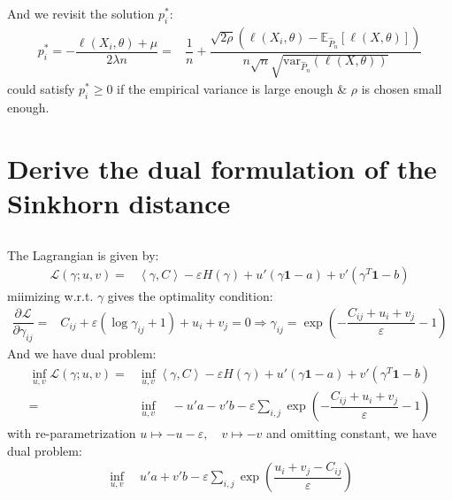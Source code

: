 \documentclass[11pt,a4paper]{ctexart}
\numberwithin{equation}{section}%
\begin{document}
And we revisit the solution $ p_i^* $:
\begin{align*}
    p_i^* = - \dfrac{ \ell(X_i,\theta )+\mu  }{ 2\lambda n } = & \dfrac{ 1 }{ n }+ \dfrac{ \sqrt{2\rho }(\ell(X_i,\theta )- \mathbb{E}_{\hat{P}_n}\left[ \ell(X,\theta ) \right] ) }{ n\sqrt{n} \sqrt{\mathrm{var}_{\hat{P}_n}(\ell(X,\theta ))} }  
\end{align*}
could satisfy $ p_i^*\geq 0 $ if the empirical variance is large enough \& $ \rho  $ is chosen small enough.


\section{Derive the dual formulation of the Sinkhorn distance}

\subsection{}
The Lagrangian is given by:
\begin{align*}
    \mathcal{L}(\gamma ; u,v)=& \left\langle \gamma ,C \right\rangle -\varepsilon  H(\gamma ) + u'(\gamma \mathbf{1}-a) + v'(\gamma ^T\mathbf{1}-b) 
\end{align*}
miimizing w.r.t. $ \gamma  $ gives the optimality condition: 
\begin{align*}
    \dfrac{\partial^{} \mathcal{L} }{\partial \gamma_{ij} }=&  C_{ij} + \varepsilon (\log \gamma_{ij} + 1) + u_i + v_j = 0 \Rightarrow \gamma_{ij} = \exp\left( -\dfrac{ C_{ij} + u_i + v_j }{ \varepsilon }  - 1 \right)
\end{align*}
And we have dual problem:
\begin{align*}
    \mathop{ \inf }\limits_{u,v}\mathcal{L}(\gamma ; u,v) = & \mathop{ \inf }\limits_{u,v}\left\langle \gamma ,C \right\rangle -\varepsilon  H(\gamma ) + u'(\gamma \mathbf{1}-a) + v'(\gamma ^T\mathbf{1}-b)\\
    =& \mathop{ \inf }\limits_{u,v}\quad -u'a- v'b - \varepsilon \sum_{i,j}\exp\left( -\dfrac{ C_{ij} + u_i + v_j }{ \varepsilon }  - 1 \right)
\end{align*}
with re-parametrization $ u\mapsto -u - \varepsilon ,\quad v\mapsto -v $ and omitting constant, we have dual problem:
\begin{align*}
    \mathop{ \inf }\limits_{u,v}\quad  u'a+v'b  - \varepsilon \sum_{i,j}\exp\left( \dfrac{   u_i + v_j -C_{ij}}{ \varepsilon }   \right)
\end{align*}

\subsection{}
\end{document}
